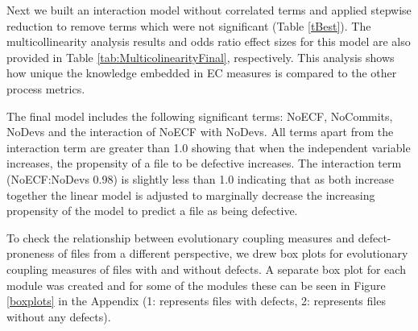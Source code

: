 \documentclass[times]{smrauth}
\begin{document}
Next we built an interaction model without correlated terms and applied stepwise reduction to remove terms which were not significant (Table \ref{tBest}). The multicollinearity analysis results and odds ratio effect sizes for this model are also provided in Table \ref{tab:MulticolinearityFinal}, respectively. This analysis shows how unique the knowledge embedded in EC measures is compared to the other process metrics.

The final model includes the following significant terms: NoECF, NoCommits, NoDevs and the interaction of  NoECF with NoDevs.  All terms apart from the interaction term are greater than 1.0 showing that when the independent variable increases, the propensity of a file to be defective increases.  The interaction term (NoECF:NoDevs 0.98) is slightly less than 1.0  indicating that as both increase together the linear model is adjusted to marginally decrease the increasing propensity of the model to predict a file as being defective.

To check the relationship between evolutionary coupling measures and defect-proneness of files from a different perspective, we drew box plots for evolutionary coupling measures of files with and without defects. A separate box plot for each module was created and for some of the modules these can be seen in Figure \ref{boxplots} in the Appendix (1: represents files with defects, 2: represents files without any defects). 




\end{document}
